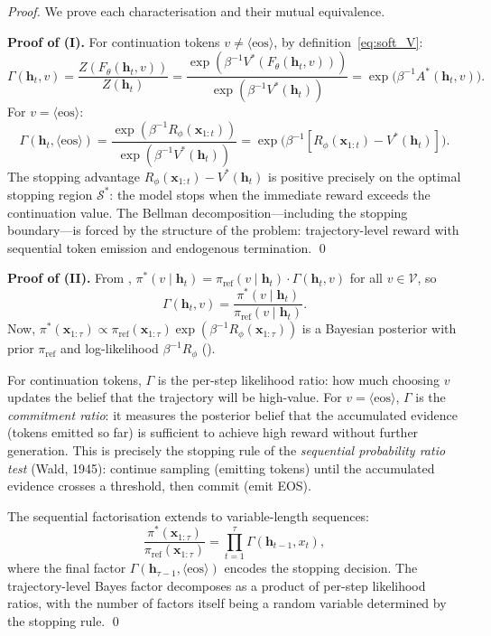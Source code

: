 \documentclass[11pt,a4paper]{article}
\theoremstyle{plain}
\theoremstyle{definition}
\theoremstyle{remark}
\newcommand{\cS}{\mathcal{S}}
\newcommand{\vocab}{\mathcal{V}}
\begin{document}
\begin{proof}
We prove each characterisation and their mutual equivalence.

\medskip
\noindent\textbf{Proof of (I).}
For continuation tokens $v \neq \langle\mathrm{eos}\rangle$,
by definition~\eqref{eq:soft_V}:
\[
  \Gamma(\bm{h}_t, v)
  = \frac{Z(F_\theta(\bm{h}_t, v))}{Z(\bm{h}_t)}
  = \frac{\exp(\beta^{-1} V^*(F_\theta(\bm{h}_t, v)))}%
         {\exp(\beta^{-1} V^*(\bm{h}_t))}
  = \exp\!\bigl(\beta^{-1} A^*(\bm{h}_t, v)\bigr).
\]
For $v = \langle\mathrm{eos}\rangle$:
\[
  \Gamma(\bm{h}_t, \langle\mathrm{eos}\rangle)
  = \frac{\exp(\beta^{-1} R_\phi(\bm{x}_{1:t}))}%
         {\exp(\beta^{-1} V^*(\bm{h}_t))}
  = \exp\!\bigl(\beta^{-1}[R_\phi(\bm{x}_{1:t}) - V^*(\bm{h}_t)]\bigr).
\]
The stopping advantage $R_\phi(\bm{x}_{1:t}) - V^*(\bm{h}_t)$ is positive
precisely on the optimal stopping region $\cS^*$: the model stops when the
immediate reward exceeds the continuation value. The Bellman
decomposition---including the stopping boundary---is forced by the structure
of the problem: trajectory-level reward with sequential token emission and
endogenous termination. \qed

\medskip
\noindent\textbf{Proof of (II).}
From ,
$\pi^*(v \mid \bm{h}_t) = \pi_{\mathrm{ref}}(v \mid \bm{h}_t) \cdot
\Gamma(\bm{h}_t, v)$ for all $v \in \vocab$, so
\[
  \Gamma(\bm{h}_t, v)
  = \frac{\pi^*(v \mid \bm{h}_t)}{\pi_{\mathrm{ref}}(v \mid \bm{h}_t)}.
\]
Now, $\pi^*(\bm{x}_{1:\tau}) \propto \pi_{\mathrm{ref}}(\bm{x}_{1:\tau})
\exp(\beta^{-1} R_\phi(\bm{x}_{1:\tau}))$ is a Bayesian posterior with
prior $\pi_{\mathrm{ref}}$ and log-likelihood $\beta^{-1} R_\phi$
().

For continuation tokens, $\Gamma$ is the per-step likelihood ratio:
how much choosing $v$ updates the belief that the trajectory will be
high-value. For $v = \langle\mathrm{eos}\rangle$, $\Gamma$ is the
\emph{commitment ratio}: it measures the posterior belief that the
accumulated evidence (tokens emitted so far) is sufficient to achieve
high reward without further generation. This is precisely the stopping
rule of the \emph{sequential probability ratio test} (Wald, 1945):
continue sampling (emitting tokens) until the accumulated evidence
crosses a threshold, then commit (emit EOS).

The sequential factorisation extends to variable-length sequences:
\begin{equation}\label{eq:sequential_bayes}
  \frac{\pi^*(\bm{x}_{1:\tau})}{\pi_{\mathrm{ref}}(\bm{x}_{1:\tau})}
  = \prod_{t=1}^{\tau} \Gamma(\bm{h}_{t-1}, x_t),
\end{equation}
where the final factor $\Gamma(\bm{h}_{\tau-1}, \langle\mathrm{eos}\rangle)$
encodes the stopping decision. The trajectory-level Bayes factor decomposes
as a product of per-step likelihood ratios, with the number of factors
itself being a random variable determined by the stopping rule. \qed


\end{proof}
\end{document}
